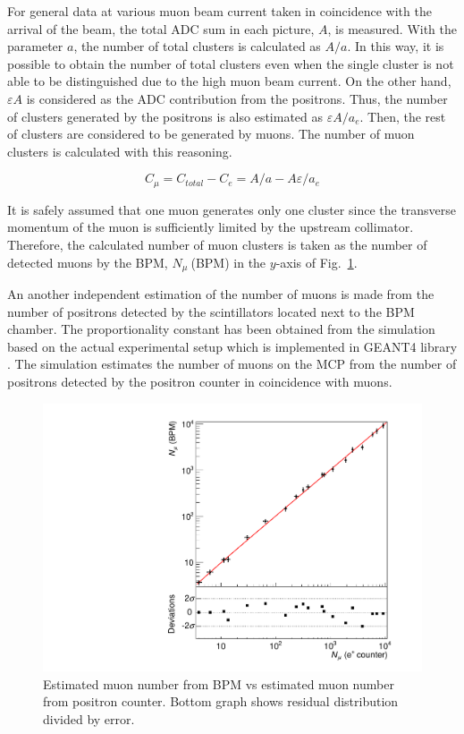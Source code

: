 \documentclass[preprint,3p,twocolumn]{elsarticle}
\begin{document}
For general data at various muon beam current taken in coincidence with the arrival of the beam, the total ADC sum in each picture, $A$, is measured. With the parameter $a$, the number of total clusters is calculated as $A/a$. In this way, it is possible to obtain the number of total clusters even when the single cluster is not able to be distinguished due to the high muon beam current. On the other hand, $\varepsilon A$ is considered as the ADC contribution from the positrons. Thus, the number of clusters generated by the positrons is also estimated as $\varepsilon A/a_e$. Then, the rest of clusters are considered to be generated by muons. The number of muon clusters is calculated with this reasoning.
\begin{linenomath}
\begin{equation}
C_{\mu} = C_{total} - C_{e}= A/a - A\varepsilon/a_e
\end{equation}
\end{linenomath}

It is safely assumed that one muon generates only one cluster since the transverse momentum of the muon is sufficiently limited by the upstream collimator. Therefore, the calculated number of muon clusters is taken as the number of detected muons by the BPM, $N_{\mu}\ $(BPM) in the $y$-axis of Fig.~\ref{fig:muvsmu}.

An another independent estimation of the number of muons is made from the number of positrons detected by the scintillators located next to the BPM chamber. The proportionality constant has been obtained from the simulation based on the actual experimental setup which is implemented in GEANT4 library \cite{geant4}. 
The simulation estimates the number of muons on the MCP from the number of positrons detected by the positron counter in coincidence with muons. 
\begin{figure}[tbp]
	\centering
	\includegraphics[width=\columnwidth]{figure/lin.pdf}
\caption{Estimated muon number from BPM vs estimated muon number from positron counter. 
Bottom graph shows residual distribution divided by error.}
\label{fig:muvsmu}
\end{figure}
\end{document}
